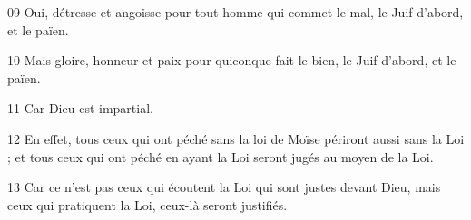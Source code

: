 
09 Oui, détresse et angoisse pour tout homme qui commet le mal, le Juif d’abord, et le païen.

10 Mais gloire, honneur et paix pour quiconque fait le bien, le Juif d’abord, et le païen.

11 Car Dieu est impartial.

12 En effet, tous ceux qui ont péché sans la loi de Moïse périront aussi sans la Loi ; et tous ceux qui ont péché en ayant la Loi seront jugés au moyen de la Loi.

13 Car ce n’est pas ceux qui écoutent la Loi qui sont justes devant Dieu, mais ceux qui pratiquent la Loi, ceux-là seront justifiés.